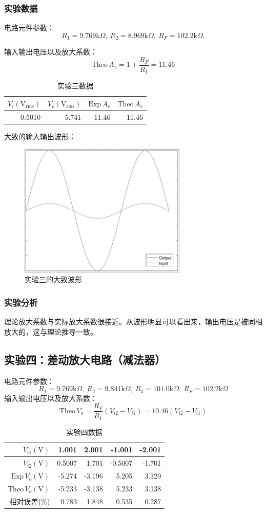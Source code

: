 \documentclass[a4paper,11pt,UTF8]{ctexart}
\newcommand\mr[1]{\mathrm{#1}}
\begin{document}
\subsubsection{实验数据}
电路元件参数：
\[ R_1=9.769\mr{k}\Omega,~R_2=8.969\mr{k}\Omega,~R_F=102.2\mr{k}\Omega. \]
\par 输入输出电压以及放大系数：
\[ \mr{Theo}\,A_v=1+\frac{R_F}{R_1}=11.46 \]
\begin{table}[H]
 \centering
 \begin{tabular}{|r|r|r|r|}
 \hline
  $V_i(\mr{V_{rms}})$ &$V_o(\mr{V_{rms}})$ &$\mr{Exp}\,A_v$ 
  &$\mr{Theo}\,A_v$
  \\\hline
  0.5010 &5.741 &11.46 &11.46
  \\\hline
 \end{tabular}
 \caption{实验三数据}
\end{table}
大致的输入输出波形：
\begin{figure}[H]
 \centering
 \includegraphics[width=8cm]{Exp03Wave}
 \caption{实验三的大致波形}
 \label{fig:Exp03Wave}
\end{figure}
\subsubsection{实验分析}
理论放大系数与实际放大系数很接近。从波形明显可以看出来，输出电压是被同相放大的，这与理论推导一致。

\subsection{实验四：差动放大电路（减法器）}
电路元件参数：
\[ R_1=9.769\mr{k}\Omega,~R_2=9.841\mr{k}\Omega,~R_3=101.0\mr{k}\Omega,~R_F=102.2\mr{k}\Omega \]
输入输出电压以及放大系数：
\[ \mr{Theo}\,V_o=\frac{R_F}{R_1}(V_{i2}-V_{i1})
=10.46(V_{i2}-V_{i1}) \]
\begin{table}[H]
 \centering
 \begin{tabular}{|r|r|r|r|r|}
 \hline
  $V_{i1}(\mr{V})$ &1.001 &2.001 &-1.001 &-2.001
  \\\hline
  $V_{i2}(\mr{V})$ &0.5007 &1.701 &-0.5007 &-1.701
  \\\hline
  $\mr{Exp}\,V_o(\mr{V})$ &-5.274 &-3.196 &5.205 &3.129
  \\\hline
  $\mr{Theo}\,V_o(\mr{V})$ &-5.233 &-3.138 &5.233 &3.138
  \\\hline
  相对误差(\%) &0.783 &1.848 &0.535 &0.287
  \\\hline
 \end{tabular}
 \caption{实验四数据}
\end{table}
\end{document}
